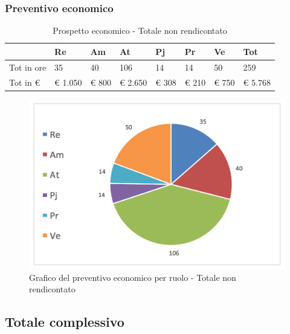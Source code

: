 			\subsubsection {Preventivo economico}
			\begin{table}[H] \begin{center} \begin{tabular}{llllllll}
			\toprule
				&	\textbf{Re}	&	\textbf{Am}	&	\textbf{At}	&	\textbf{Pj}	&	\textbf{Pr}	&	\textbf{Ve}	&	\textbf{Tot}\\

			\midrule
			Tot in ore	&	35	&	40	&	106	&	14	&	14	&	50	&	259	 \\


			Tot in €	&	 €        1.050 	 & 	 €        800 	 & 	 €        2.650 	 & 	 €        308 	 & 	 €            210 	 & 	 €        750 	 & 	 €              5.768 	 \\
			\bottomrule
			\end{tabular} \end{center} \caption{Prospetto economico -
			Totale non rendicontato
			}\label{tab:s_TotaleNonRendicontato} \end{table}
			\begin{figure}[H]
			\centering
			\includegraphics[scale=0.40]{img/s_TotaleNonRendicontato}
			\caption{Grafico del preventivo economico per ruolo - Totale non rendicontato}
			\label{fig:TotaleNonRendicontato}
			\end{figure}
		\newpage
		\subsection {Totale complessivo}
